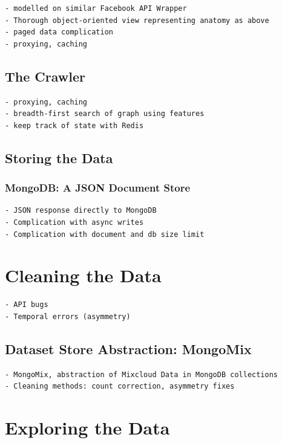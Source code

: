 \documentclass[a4paper,12pt,twoside,notitlepage]{report}
\begin{document}
\begin{verbatim}
- modelled on similar Facebook API Wrapper
- Thorough object-oriented view representing anatomy as above
- paged data complication
- proxying, caching
\end{verbatim}

\subsection{The Crawler}

\begin{verbatim}
- proxying, caching
- breadth-first search of graph using features
- keep track of state with Redis 
\end{verbatim}

\subsection{Storing the Data}

\subsubsection{MongoDB: A JSON Document Store}
\begin{verbatim}
- JSON response directly to MongoDB
- Complication with async writes
- Complication with document and db size limit
\end{verbatim}

\section{Cleaning the Data}

\begin{verbatim}
- API bugs
- Temporal errors (asymmetry)
\end{verbatim}

\subsection{Dataset Store Abstraction: MongoMix}


\begin{verbatim}
- MongoMix, abstraction of Mixcloud Data in MongoDB collections
- Cleaning methods: count correction, asymmetry fixes
\end{verbatim}

\section{Exploring the Data}
\end{document}
